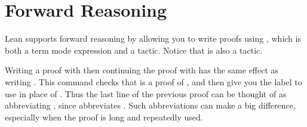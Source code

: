 \documentclass[letterpaper,10pt,english]{sphinxmanual}
\begin{document}
\section{Forward Reasoning}
\label{\detokenize{propositional_logic_in_lean:forward-reasoning}}
\sphinxAtStartPar
Lean supports forward reasoning by allowing you to write
proofs using ,
which is both a term mode expression and a tactic.
Notice that  is also a tactic.

\begin{sphinxVerbatim}[commandchars=\\\{\}]
     
     

     
      
        
      

      
     
        
   
    
\end{sphinxVerbatim}

\sphinxAtStartPar
Writing a proof with
 then continuing the proof with
 has the same effect as writing .
This  command checks that \sphinxcode{\sphinxupquote{\_}} is a proof of ,
and then give you the label  to use in place of \sphinxcode{\sphinxupquote{\_}}.
Thus the last line of the previous proof can be thought of as
abbreviating ,
since  abbreviates .
Such abbreviations can make a big difference,
especially when the proof \sphinxcode{\sphinxupquote{\_}} is long and repeatedly used.
\end{document}
